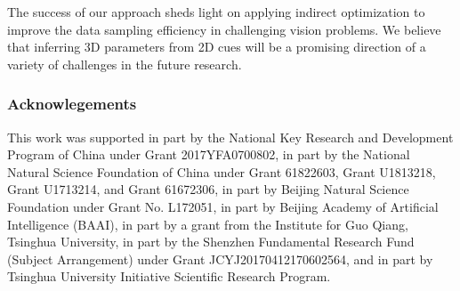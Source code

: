 \documentclass[runningheads]{llncs}
\begin{document}
The success of our approach sheds light on applying indirect optimization to improve the data sampling efficiency in challenging vision problems. 
We believe that inferring 3D parameters from 2D cues will be a promising direction of a variety of challenges in the future research.

\subsubsection*{Acknowlegements}
This work was supported in part by the National Key Research and Development Program of China under Grant 2017YFA0700802, in part by the National Natural Science Foundation of China under Grant 61822603, Grant U1813218, Grant U1713214, and Grant 61672306, in part by Beijing Natural Science Foundation under Grant No. L172051, in part by Beijing Academy of Artificial Intelligence (BAAI), in part by a grant from the Institute for Guo Qiang, Tsinghua University, in part by the Shenzhen Fundamental Research Fund (Subject Arrangement) under Grant JCYJ20170412170602564, and in part by Tsinghua University Initiative Scientific Research Program.



\end{document}
